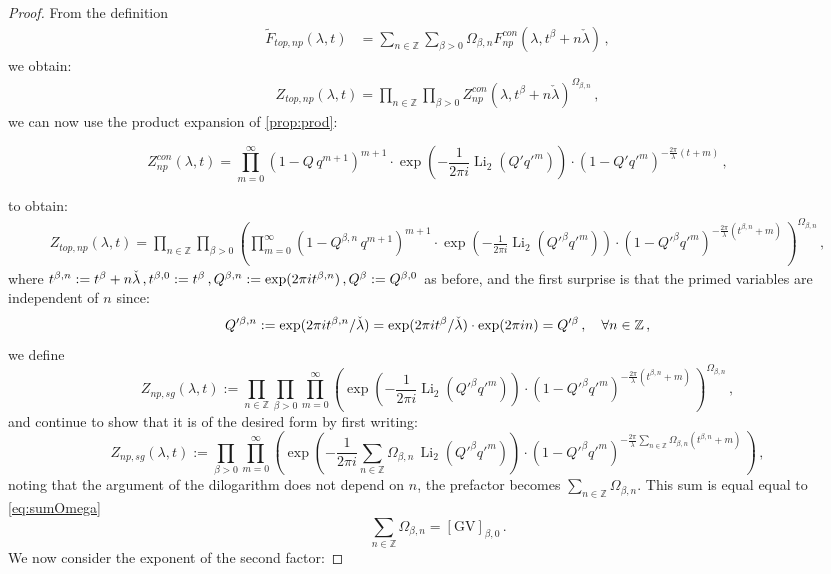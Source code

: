 \documentclass[a4paper,12pt,justification=centering]{article}
\numberwithin{equation}{section}
\newcommand{\ii}{\textnormal{i}}
\theoremstyle{plain}%
\theoremstyle{definition}
\begin{document}
\begin{proof}
From the definition
\begin{align}
\tilde{F}_{top,np}(\lambda,t) &= \sum_{n\in \mathbb{Z}}  \sum_{\beta>0}   \Omega_{\beta,n} F^{con}_{np} (\lambda, t^{\beta}+ n \check{\lambda}) \,, 
\end{align}
we obtain:
\begin{align}
Z_{top,np}(\lambda,t) = \prod_{n\in \mathbb{Z}}  \prod_{\beta>0}    Z^{con}_{np} (\lambda, t^{\beta}+ n \check{\lambda})^{\Omega_{\beta,n}} \,, 
\end{align}
we can now use the product expansion of \eqref{prop:prod}:

$$Z^{con}_{np}(\lambda,t)= \prod_{m=0}^{\infty} (1-Q\, q^{m+1})^{m+1}  \cdot \exp\left(-\frac{1}{2\pi i} \operatorname{Li}_2(Q' q'^m)\right) \cdot (1-Q' q'^m)^{-\frac{2\pi}{\lambda}\left( t+m\right)}\,, $$

to obtain:
\begin{align}
Z_{top,np}(\lambda,t) = \prod_{n\in \mathbb{Z}}  \prod_{\beta>0}   \left( \prod_{m=0}^{\infty} (1-Q^{\beta,n}\, q^{m+1})^{m+1}  \cdot \exp\left(-\frac{1}{2\pi i} \operatorname{Li}_2(Q'^{\beta} q'^m)\right) \cdot (1-Q'^{\beta} q'^m)^{-\frac{2\pi}{\lambda}\left( t^{\beta,n}+m\right)}\,\right) ^{\Omega_{\beta,n}} \,, 
\end{align}
where $t^{\beta,n}:=t^{\beta}+ n \check{\lambda}\,, t^{\beta,0}:=t^{\beta}\, , Q^{\beta,n}:=\exp(2\pi \ii t^{\beta,n})\,, Q^{\beta}:=Q^{\beta,0}$ as before, and the first surprise is that the primed variables are independent of $n$ since:
$$ Q'^{\beta,n}:=\exp(2\pi \ii t^{\beta,n}/\check{\lambda})=\exp(2\pi \ii t^{\beta}/\check{\lambda})\cdot \exp(2\pi \ii n)=Q'^{\beta}\,, \quad \forall n\in \mathbb{Z}\,,$$
we define
\begin{equation}
Z_{np,sg}(\lambda,t):=\prod_{n\in \mathbb{Z}}  \prod_{\beta>0} \prod_{m=0}^{\infty}  \left(\exp\left(-\frac{1}{2\pi i} \operatorname{Li}_2(Q'^{\beta} q'^m)\right) \cdot (1-Q'^{\beta} q'^m)^{-\frac{2\pi}{\lambda}\left( t^{\beta,n}+m\right)}\,\right)^{\Omega_{\beta,n}} \,, 
\end{equation}
and continue to show that it is of the desired form by first writing:
\begin{equation}
Z_{np,sg}(\lambda,t):=\prod_{\beta>0}  \prod_{m=0}^{\infty}   \left(\exp\left(-\frac{1}{2\pi i} \sum_{n\in\mathbb{Z}} \Omega_{\beta,n}\, \operatorname{Li}_2(Q'^{\beta} q'^m)\right) \cdot (1-Q'^{\beta} q'^m)^{-\frac{2\pi}{\lambda} \sum_{n\in\mathbb{Z}} \Omega_{\beta,n} \left( t^{\beta,n}+m\right)}\,\right) \,, 
\end{equation}
noting that the argument of the dilogarithm does not depend on $n$, the prefactor becomes $\sum_{n\in\mathbb{Z}} \Omega_{\beta,n}$. This sum is equal equal to \eqref{eq:sumOmega}\begin{equation}
\sum_{n\in \mathbb{Z}} \Omega_{\beta,n}  = [\textrm{GV}]_{\beta,0}\,.
\end{equation}
We now consider the exponent of the second factor:


\end{proof}
\end{document}
